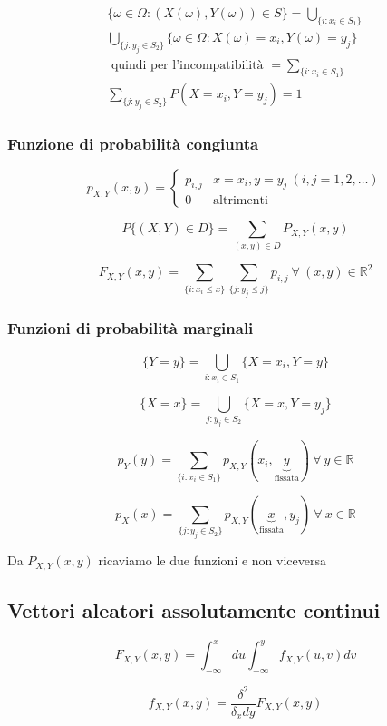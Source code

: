 \begin{multicols*}{2}
\begin{align*}
\{ \omega \in \Omega : (X(\omega), Y(\omega)) \in S\} = 
    \bigcup_{\{i: x_i \in S_1\}}
    \\\bigcup_{\{j: y_j \in S_2\}}
    \{\omega \in \Omega : X(\omega) = x_i, Y(\omega) = y_j\}\\
\text{ quindi per l'incompatibilità } =
    \sum_{\{i: x_i \in S_1\}}
    \\\sum_{\{j: y_j \in S_2\}}
    P(X = x_i, Y = y_j) = 1
\end{align*}

\subsubsection*{Funzione di probabilità congiunta}

$$p_{X,Y}(x, y) =
\begin{cases}
    p_{i,j} & x = x_i, y = y_j \ (i, j = 1,2,\dots)\\
    0 & \text{altrimenti}
\end{cases}$$

$$
P\{(X,Y) \in D\} = \sum_{(x,y) \in D}P_{X,Y}(x,y)
$$

$$
F_{X,Y}(x,y) = \sum_{\{i : x_i \le x\}} \sum_{\{j : y_j \le j\}} p_{i,j} 
\ \forall \ (x, y) \in \mathbb{R}^2
$$

\subsubsection*{Funzioni di probabilità marginali}
$$
\{Y=y\} = \bigcup_{i : x_i \in S_1}\{X=x_i, Y=y\}
$$

$$
\{X=x\} = \bigcup_{j : y_j \in S_2}\{X=x, Y=y_j\}
$$

$$
p_Y(y) = \sum_{\{i: x_i \in S_1\}}p_{X,Y}(x_i, \underbrace{y}_{\text{fissata}}) \ \forall \ y \in \mathbb{R}
$$

$$
p_X(x) = \sum_{\{j: y_j \in S_2\}}p_{X,Y}(\underbrace{x}_{\text{fissata}}, y_j) \ \forall \ x \in \mathbb{R}
$$

Da $P_{X,Y}(x,y)$ ricaviamo le due funzioni e non viceversa

\subsection*{Vettori aleatori assolutamente continui}
$$
F_{X,Y}(x,y) = \int_{-\infty}^{x}du \int_{-\infty}^{y} f_{X,Y}(u,v) dv
$$

$$
f_{X,Y}(x,y) = \frac{\delta^2}{\delta_x dy} F_{X,Y}(x,y)
$$


\end{multicols*}
